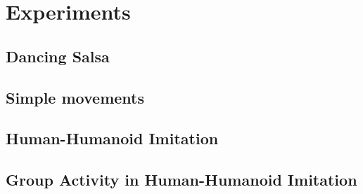 
\chapter{Experiments}

\ifpdf
    \graphicspath{{Chapter4/Figs/Raster/}{Chapter4/Figs/PDF/}{Chapter4/Figs/}}
\else
    \graphicspath{{Chapter4/Figs/Vector/}{Chapter4/Figs/}}
\fi



\section{Dancing Salsa}
\section{Simple movements}
\section{Human-Humanoid Imitation}
\section{Group Activity in Human-Humanoid Imitation}
